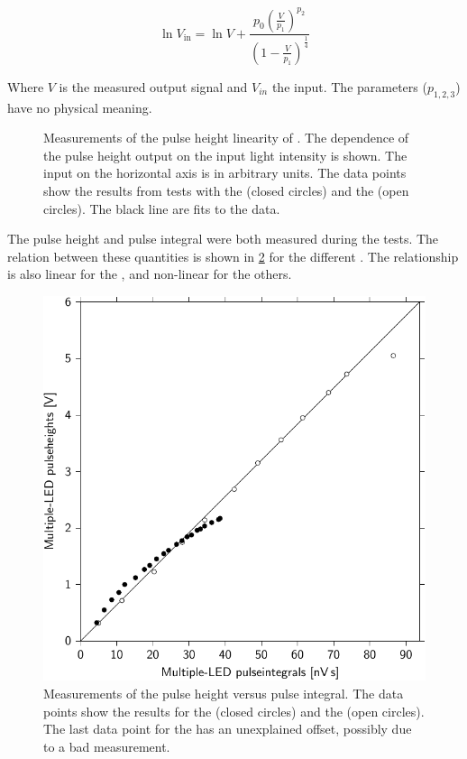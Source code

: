 \begin{equation}
    \ln V_{\mathrm{in}} = \ln V +
                          \frac{p_0 \left(\frac{V}{p_1}\right)^{p_2}}
                               {\left(1 - \frac{V}{p_1}\right)^{\frac{1}{4}}}
\end{equation}

Where $V$ is the measured output signal and $V_{in}$ the input. The parameters ($p_{1,2,3}$) have no physical meaning.

\begin{figure}
    \centering
    
    \caption{Measurements of the pulse height linearity of \pmts. The dependence of the pulse height output on the input light intensity is shown. The input on the horizontal axis is in arbitrary units. The data points show the results from tests with the \senstech \pmt (closed circles) and the \nikhef \pmt (open circles). The black line are fits to the data.}
    \label{fig:linearity_pmts}
\end{figure}

The pulse height and pulse integral were both measured during the tests. The relation between these quantities is shown in \cref{fig:ph_pi_compared_nikhef_senstech} for the different \pmts. The relationship is also linear for the \nikhef \pmt, and non-linear for the others.

\begin{figure}
    \centering
    \includegraphics[width=.7\linewidth]
                    {plots/detector/ph_pi_compared_nikhef_senstech}
    \caption{Measurements of the pulse height versus pulse integral. The data points show the results for the \senstech \pmt (closed circles) and the \nikhef \pmt (open circles). The last data point for the \nikhef \pmt has an unexplained offset, possibly due to a bad measurement.}
    \label{fig:ph_pi_compared_nikhef_senstech}
\end{figure}

